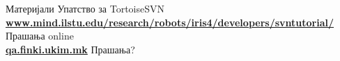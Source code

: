 \begin{frame}{Материјали}{}
    Упатство за TortoiseSVN
    \href{http://www.mind.ilstu.edu/research/robots/iris4/developers/svntutorial/}
{\scriptsize{\textbf{www.mind.ilstu.edu/research/robots/iris4/developers/svntutorial/}}}
    \vfill
    {\Large Прашања online}\\
	\href{http://qa.finki.ukim.mk/}{\textbf{qa.finki.ukim.mk}}
	\vfill
	{\Huge Прашања?}
\end{frame}


